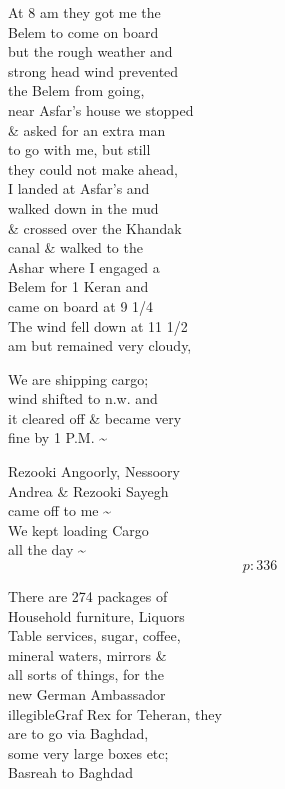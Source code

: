 \documentclass{report}
\begin{document}
	\par{
 	At 8 am they got me the\ \\Belem to come on board\ \\but the rough weather and\ \\strong head wind prevented\ \\the Belem from going,\ \\near Asfar's house we stopped\ \\\& asked for an extra man\ \\to go with me, but still\ \\they could not make ahead,\ \\I landed at Asfar's and\ \\walked down in the mud\ \\\& crossed over the Khandak\ \\canal \& walked to the\ \\Ashar where I engaged a\ \\Belem for 1 Keran and\ \\came on board at 9 1/4\ \\The wind fell down at 11 1/2\ \\am but remained very cloudy,\ \\
	}

	\par{
 	We are shipping cargo;\ \\wind shifted to n.w. and\ \\it cleared off \& became very\ \\fine by 1 P.M. \~{}\ \\
	}

	\par{
 	Rezooki Angoorly, Nessoory\ \\Andrea \& Rezooki Sayegh\ \\came off to me \~{}\ \\We kept loading Cargo\ \\all the day \~{}\ \\
  \[p: 336 \]

	}





	\par{
 	There are 274 packages of\ \\Household furniture, Liquors\ \\Table services, sugar, coffee,\ \\mineral waters, mirrors \&\ \\all sorts of things, for the\ \\new German Ambassador\ \\\lbrack illegible\rbrack Graf Rex for Teheran, they\ \\are to go via Baghdad,\ \\some very large boxes etc;\ \\Basreah to Baghdad\ \\
	}
\end{document}
